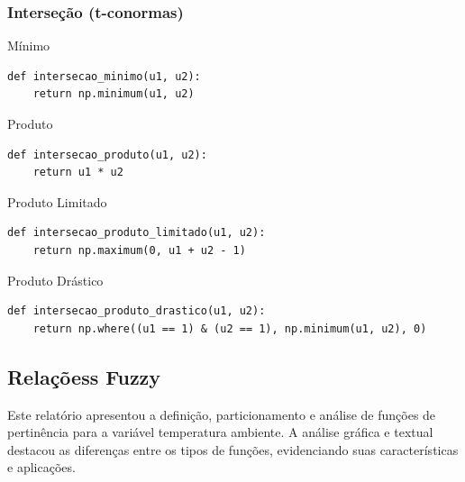 \documentclass[a4paper,12pt]{article}
\begin{document}
\subsubsection{Interseção (t-conormas)}
Mínimo
\begin{verbatim}
def intersecao_minimo(u1, u2):
    return np.minimum(u1, u2)
\end{verbatim}

Produto
\begin{verbatim}
def intersecao_produto(u1, u2):
    return u1 * u2
\end{verbatim}


Produto Limitado
\begin{verbatim}
def intersecao_produto_limitado(u1, u2):
    return np.maximum(0, u1 + u2 - 1)
\end{verbatim}

Produto Drástico
\begin{verbatim}
def intersecao_produto_drastico(u1, u2):
    return np.where((u1 == 1) & (u2 == 1), np.minimum(u1, u2), 0)
\end{verbatim}

\subsection{Relaçõess Fuzzy}



Este relatório apresentou a definição, particionamento e análise de funções de pertinência para a variável temperatura ambiente. A análise gráfica e textual destacou as diferenças entre os tipos de funções, evidenciando suas características e aplicações.
\end{document}
